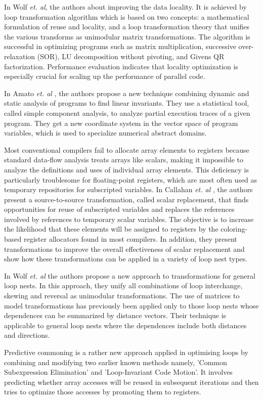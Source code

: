 In Wolf \textsl{et. al}\cite{wolf1991data}, the authors about improving the data locality. It is achieved by loop transformation algorithm which is based on two concepts: a mathematical formulation of reuse and locality, and a loop transformation theory that unifies the various transforms as unimodular matrix transformations. The algorithm is successful in optimizing programs such as matrix multiplication, successive over-relaxation (SOR), LU decomposition without pivoting, and Givens QR factorization. Performance evaluation indicates that locality optimization is especially crucial for scaling up the performance of parallel code.


In Amato \textsl{et. al} \cite{amato2012discovering}, the authors propose a new technique combining dynamic and static analysis of programs to find linear invariants. They use a statistical tool, called simple component analysis, to analyze partial execution traces of a given program. They get a new coordinate system in the vector space of program variables, which is used to specialize numerical abstract domains.

Most conventional compilers fail to allocate array elements to registers because standard data-flow analysis treats arrays like scalars, making it impossible to analyze the definitions and uses of individual array elements. This deficiency is particularly troublesome for floating-point registers, which are most often used as temporary repositories for subscripted variables. In Callahan \textsl{et. al} \cite{callahan1990improving}, the authors present a source-to-source transformation, called scalar replacement, that finds opportunities for reuse of subscripted variables and replaces the references involved by references to temporary scalar variables. The objective is to increase the likelihood that these elements will be assigned to registers by the coloring-based register allocators found in most compilers. In addition, they present transformations to improve the overall effectiveness of scalar replacement and show how these transformations can be applied in a variety of loop nest types.

In Wolf \textsl{et. al} \cite{wolf1991loop} the authors propose a new approach to transformations for general loop nests. In this approach, they unify all combinations of loop interchange, skewing and reversal as unimodular transformations. The use of matrices to model transformations has previously been applied only to those loop nests whose dependences can be summarized by distance vectors. Their technique is applicable to general loop nests where the dependences include both distances and directions.

Predictive commoning is a rather new approach applied in optimising loops by combining and modifying two earlier known methods namely, ’Common Subexpression Elimination’ and ’Loop-Invariant Code Motion’. It involves predicting whether array accesses will be reused in subsequent iterations and then tries to optimize those accesses by promoting them to registers.